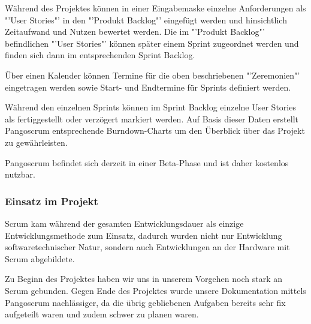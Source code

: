 Während des Projektes können in einer Eingabemaske einzelne Anforderungen als "'User Stories"' in den "'Produkt Backlog"' eingefügt werden und hinsichtlich Zeitaufwand und Nutzen bewertet werden. Die im "'Produkt Backlog"' befindlichen "'User Stories"' können später einem Sprint zugeordnet werden und finden sich dann im entsprechenden Sprint Backlog.

Über einen Kalender können Termine für die oben beschriebenen "'Zeremonien"' eingetragen werden sowie Start- und Endtermine für Sprints definiert werden.

Während den einzelnen Sprints können im Sprint Backlog einzelne User Stories als fertiggestellt oder verzögert markiert werden. Auf Basis dieser Daten erstellt Pangoscrum entsprechende Burndown-Charts um den Überblick über das Projekt zu gewährleisten.

Pangoscrum befindet sich derzeit in einer Beta-Phase und ist daher kostenlos nutzbar.

\subsubsection{Einsatz im Projekt}
Scrum kam während der gesamten Entwicklungsdauer als einzige Entwicklungsmethode zum Einsatz, dadurch wurden nicht nur Entwicklung softwaretechnischer Natur, sondern auch Entwicklungen an der Hardware mit Scrum abgebildete. 

Zu Beginn des Projektes haben wir uns in unserem Vorgehen noch stark an Scrum gebunden. Gegen Ende des Projektes wurde unsere Dokumentation mittels Pangoscrum nachlässiger, da die übrig gebliebenen Aufgaben bereits sehr fix aufgeteilt waren und zudem schwer zu planen waren.
